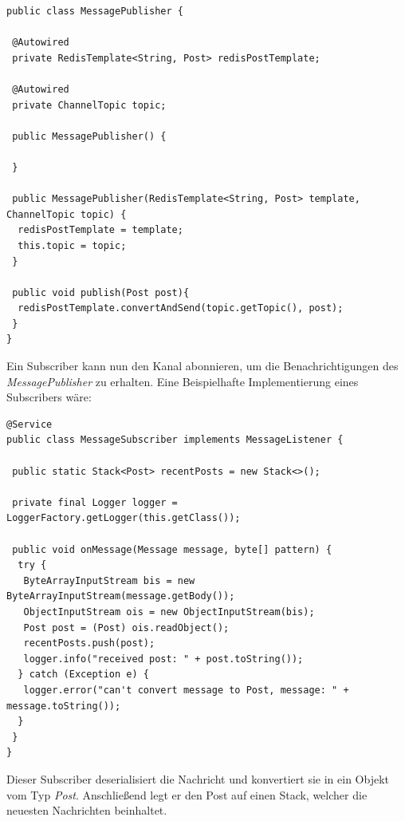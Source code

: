 \documentclass[
    a4paper
]{scrreprt}
\begin{document}
	\begin{lstlisting}
public class MessagePublisher {

 @Autowired
 private RedisTemplate<String, Post> redisPostTemplate;

 @Autowired
 private ChannelTopic topic;

 public MessagePublisher() {

 }

 public MessagePublisher(RedisTemplate<String, Post> template, ChannelTopic topic) {
  redisPostTemplate = template;
  this.topic = topic; 
 }

 public void publish(Post post){
  redisPostTemplate.convertAndSend(topic.getTopic(), post);
 }
}
	\end{lstlisting}
	Ein Subscriber kann nun den Kanal abonnieren, um die Benachrichtigungen des \textit{MessagePublisher} zu erhalten. Eine Beispielhafte Implementierung eines Subscribers wäre:
	\begin{lstlisting}
@Service
public class MessageSubscriber implements MessageListener {

 public static Stack<Post> recentPosts = new Stack<>();

 private final Logger logger = LoggerFactory.getLogger(this.getClass());

 public void onMessage(Message message, byte[] pattern) {
  try {
   ByteArrayInputStream bis = new ByteArrayInputStream(message.getBody());
   ObjectInputStream ois = new ObjectInputStream(bis);
   Post post = (Post) ois.readObject();
   recentPosts.push(post);
   logger.info("received post: " + post.toString());
  } catch (Exception e) {
   logger.error("can't convert message to Post, message: " + message.toString());
  }
 }
}
	\end{lstlisting}
	Dieser Subscriber deserialisiert die Nachricht und konvertiert sie in ein Objekt vom Typ \textit{Post}. Anschließend legt er den Post auf einen Stack, welcher die neuesten Nachrichten beinhaltet. 
\end{document}
